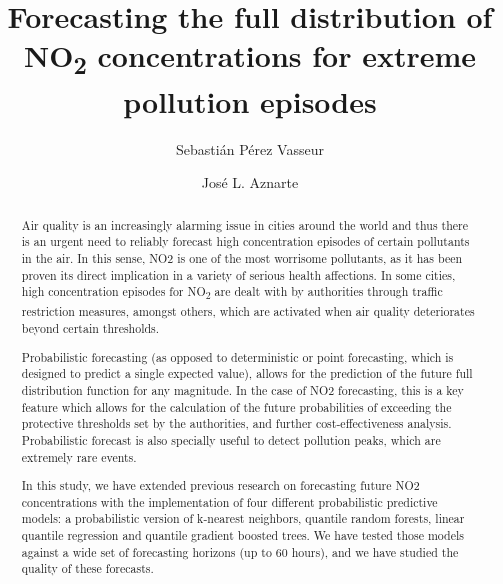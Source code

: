 \documentclass[a4paper,twocolumn,5p]{elsarticle}
\begin{document}
\newcommand{\no}{NO\textsubscript{2}\xspace}

\begin{frontmatter}

  \title{Forecasting the full distribution of \no concentrations for
    extreme pollution episodes}

\author{Sebasti\'an P\'erez Vasseur} 
\address{Artificial Intelligence Department\\Universidad Nacional de
  Educaci\'on a Distancia --- UNED\\c/ Juan del Rosal, 16, Madrid, Spain}

\author{Jos\'e L. Aznarte}
\address{Artificial Intelligence Department\\Universidad Nacional de
  Educaci\'on a Distancia --- UNED\\c/ Juan del Rosal, 16, Madrid, Spain}



\begin{abstract}
Air quality is an increasingly alarming issue in cities around the 
world and thus there is an urgent need to reliably forecast high 
concentration episodes of certain pollutants in the air. In this 
sense, NO2 is one of the most worrisome pollutants, as it has been 
proven its direct implication in a variety of serious health 
affections. In some cities, high concentration episodes for \no 
are dealt with by authorities through traffic restriction measures, 
amongst others, which are activated when air quality deteriorates 
beyond certain thresholds.

Probabilistic forecasting (as opposed to deterministic or 
point forecasting, which is designed to predict a single 
expected value), allows for the prediction of the future 
full distribution function for any magnitude. In the case of 
NO2 forecasting, this is a key feature which allows for the 
calculation of the future probabilities of exceeding the protective 
thresholds set by the authorities, and further cost-effectiveness 
analysis. Probabilistic forecast is also specially useful to detect 
pollution peaks, which are extremely rare events.

In this study, we have extended previous research on forecasting 
future NO2 concentrations with the implementation of four 
different probabilistic predictive models: a probabilistic 
version of k-nearest neighbors, quantile random forests, 
linear quantile regression and quantile gradient boosted trees. 
We have tested those models against a wide set of forecasting 
horizons (up to 60 hours), and we have studied the quality of 
these forecasts.


\end{abstract}
\end{frontmatter}
\end{document}
